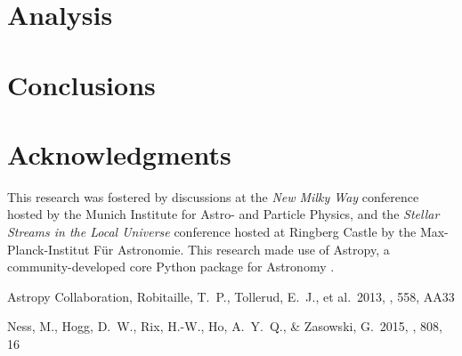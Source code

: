 \documentclass[useAMS,usenatbib]{mn2e}
\begin{document}








\section{Analysis}



\section{Conclusions}


\section*{Acknowledgments}
This research was fostered by discussions at the \textit{New Milky Way}
conference hosted by the Munich Institute for Astro- and Particle Physics, and
the \textit{Stellar Streams in the Local Universe} conference hosted at Ringberg
Castle by the Max-Planck-Institut F\"ur Astronomie. This research made use of 
Astropy, a community-developed core Python package for Astronomy \citep{astropy}.

\begin{thebibliography}{99}
 Astropy Collaboration, Robitaille, T.~P., Tollerud, E.~J., et al.\ 2013, \aap, 558, AA33

 Ness, M., Hogg, D.~W., 
Rix, H.-W., Ho, A.~Y.~Q., \& Zasowski, G.\ 2015, \apj, 808, 16 
\end{thebibliography}


\label{lastpage}
\end{document}
